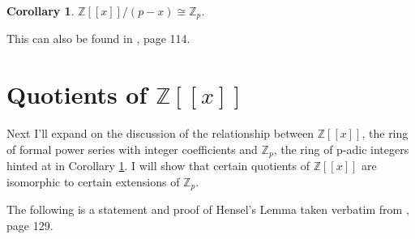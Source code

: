 \documentclass{article}
\newtheorem{corollary}{Corollary}
\begin{document}
\begin{corollary}\label{zp}
$\mathbb{Z}[[x]]/(p-x) \cong \mathbb{Z}_p$.
\end{corollary}

This can also be found in \cite{MR1697859}, page 114.  

\section{Quotients of $\mathbb{Z}[[x]]$}

Next I'll expand on the discussion of the relationship between $\mathbb{Z}[[x]]$, the ring of formal power series with integer coefficients and $\mathbb{Z}_p$, the ring of p-adic integers hinted at in Corollary \ref{zp}.  I will show that certain quotients of $\mathbb{Z}[[x]]$ are isomorphic to certain extensions of $\mathbb{Z}_p$.


The following is a statement and proof of Hensel's Lemma taken verbatim from \cite{MR1697859}, page 129.
\end{document}
